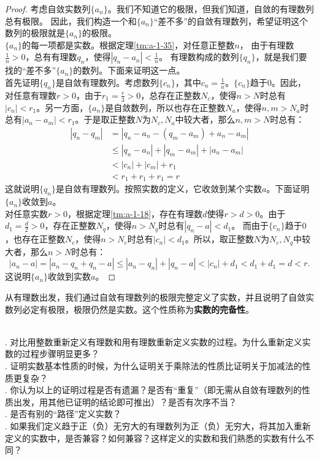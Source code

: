 \documentclass[12pt,UTF8,fontset=none]{ctexbook}
\begin{document}
\begin{appendix}
\begin{proof}
    考虑自敛实数列$\{a_n\}$。我们不知道它的极限，但我们知道，自敛的有理数列总有极限。
    因此，我们构造一个和$\{a_n\}$“差不多”的自敛有理数列，希望证明这个数列的极限就是$\{a_n\}$的极限。\\
    $\{a_n\}$的每一项都是实数。根据定理\ref{tm:a-1-35}，对任意正整数$n$，
    由于有理数$\frac{1}{n}>0$，总有有理数$q_n$，使得$|q_n - a_n| < \frac{1}{n}$。
    有理数构成的数列$\{q_n\}$，就是我们要找的“差不多”$\{a_n\}$的数列。下面来证明这一点。\\
    首先证明$\{q_n\}$是自敛有理数列。考虑数列$\{c_n\}$，其中$c_n = \frac{1}{n}$。$\{c_n\}$趋于$0$。因此，对任意有理数$r>0$，由于$r_1 = \frac{r}{3} > 0$，总存在正整数$N_c$，使得$n>N$时总有$|c_n| < r_1$。另一方面，$\{a_n\}$是自敛数列，所以也存在正整数$N_a$，使得$n,m>N_a$时总有$|a_n - a_m| < r_1$。于是取正整数$N$为$N_c,N_a$中较大者，那么$n,m>N$时总有：
    \begin{align*}
        |q_n - q_m| &= |q_n - a_n - (q_m - a_m) + a_n -a_m|  \\
        &\leqslant |q_n - a_n| + |q_m - a_m| + |a_n - a_m|  \\
        &< |c_n| + |c_m| + r_1  \\
        &< r_1 + r_1 + r_1 = r 
    \end{align*}
    这就说明$\{q_n\}$是自敛有理数列。按照实数的定义，它收敛到某个实数$a$。下面证明$\{a_n\}$收敛到$a$。\\
    对任意实数$r>0$，根据定理\ref{tm:a-1-18}，存在有理数$d$使得$r>d>0$。由于$d_1 = \frac{d}{2}>0$，存在正整数$N_q$，使得$n>N_q$时总有$|q_n - a| < d_1$。
    而由于$\{c_n\}$趋于$0$，也存在正整数$N_c$，使得$n>N_c$时总有$|c_n| < d_1$。所以，取正整数$N$为$N_c,N_q$中较大者，那么$n>N$时总有：
    $$ |a_n - a| = |a_n - q_n + q_n - a| \leqslant |a_n - q_n| + |q_n - a| < |c_n| + d_1 < d_1 + d_1 = d < r.$$
    这说明$\{a_n\}$收敛到实数$a$。
\end{proof}

从有理数出发，我们通过自敛有理数列的极限完整定义了实数，并且说明了自敛实数列必定有极限，极限仍然是实数。这个性质称为\textbf{实数的完备性}。

\begin{sk}
    \mbox{} \\
    . 对比用整数重新定义有理数和用有理数重新定义实数的过程。为什么重新定义实数的过程步骤明显更多？\\
    . 证明实数基本性质的时候，为什么证明关于乘除法的性质比证明关于加减法的性质更复杂？\\
    . 你认为以上的证明过程是否有遗漏？是否有“重复”（即无需从自敛有理数列的性质出发，用其他已证明的结论即可推出）？是否有次序不当？\\
    . 是否有别的“路径”定义实数？\\
    . 如果我们定义趋于正（负）无穷大的有理数列为正（负）无穷大，将其加入重新定义的实数中，是否兼容？如何兼容？这样定义的实数和我们熟悉的实数有什么不同？
\end{sk} 


\end{appendix}
\end{document}
